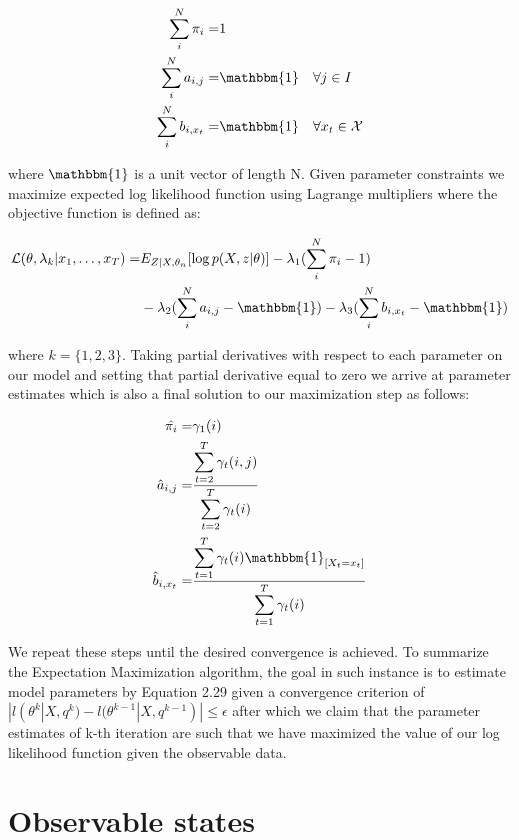 \begin{align}
\displaystyle \sum_i^N \pi_i =& 1 \\
\displaystyle \sum_i^N a_{i,j} =& \mathbbm{1} \quad  \forall j \in I \\
\displaystyle \sum_i^N b_{i,x_t} =& \mathbbm{1} \quad \forall x_t \in \mathcal{X}
\end{align} 

where $\mathbbm{1}$ is  a unit vector of length N. Given parameter constraints we maximize expected log likelihood function using Lagrange multipliers where the objective function is defined as:

\begin{align}
\mathcal{L}(\theta,\lambda_k|x_1,\ldots,x_T) =& E_{Z|X,\theta_n} [\log p(X,z|\theta)] - \lambda_1(\displaystyle \sum_i^N \pi_i - 1) \\
& - \lambda_2(\displaystyle \sum_i^N a_{i,j} -  \mathbbm{1})  - \lambda_3 (\displaystyle\sum_i^N b_{i,x_t} - \mathbbm{1})
\end{align}

 where $k=\{1,2,3\}$.  Taking partial derivatives with respect to each parameter on our model and setting that partial derivative equal to zero we arrive at parameter estimates which is also a final solution to our maximization step as follows:


\begin{align}
\hat{\pi_i} = &  \gamma_1 (i) \\
\hat{a}_{i,j} = &  \frac{\displaystyle \sum_{t=2}^{T} \gamma_t (i,j)}{\displaystyle \sum_{t=2}^{T} \gamma_t (i)} \\
\hat{b}_{i,x_t} =&\frac{\displaystyle \sum_{t=1}^{T} \gamma_t (i) \mathbbm{1}_{[X_t = x_t ]}}{\displaystyle \sum_{t=1}^{T} \gamma_t (i)} 
\end{align}


We repeat these steps until the desired convergence is achieved. To summarize the Expectation Maximization algorithm, the goal in such instance is to estimate model parameters by Equation 2.29 
given a convergence criterion of $|l(\theta^{k}|X,q^{k}) - l(\theta^{k-1}|X,q^{k-1})| \leq \epsilon $ after which we claim that the parameter estimates of k-th iteration are such that we have maximized the value of our log likelihood function given the observable data.

\section{Observable states}

